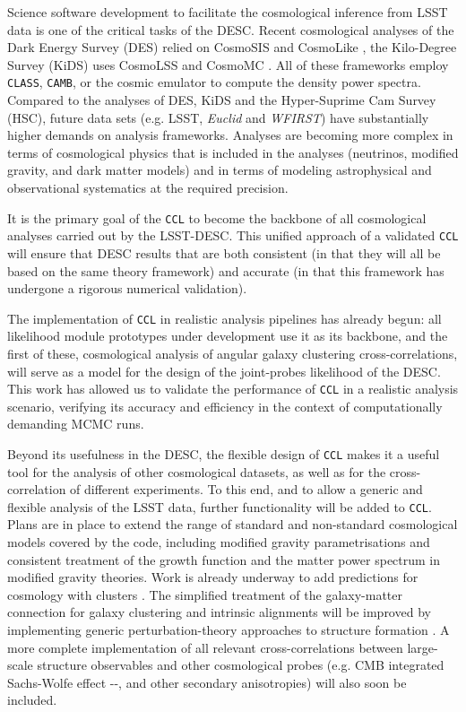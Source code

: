 \documentclass[\docopts]{\docclass}
\newcommand{\damonge}[1]{\textcolor{green!55!blue}{DA: #1}}
\newcommand{\ccl}{{\tt CCL}\xspace}
\newcommand{\class}{{\tt CLASS}\xspace}
\newcommand{\camb}{{\tt CAMB}\xspace}
\begin{document}
Science software development to facilitate the cosmological inference from LSST data is one of the critical tasks of the DESC. Recent cosmological analyses of the Dark Energy Survey (DES) relied on CosmoSIS \citep{Zuntz14} and CosmoLike \citep{krause17}, the Kilo-Degree Survey (KiDS) uses CosmoLSS \citep{Joudaki18} and CosmoMC \citep{Lewis02}. All of these frameworks employ \class, \camb \citep{Challinor2005}, or the cosmic emulator to compute the density power spectra. Compared to the analyses of DES, KiDS and the Hyper-Suprime Cam Survey (HSC), future data sets (e.g. LSST, {\it Euclid} and {\it WFIRST}) have substantially higher demands on analysis frameworks. Analyses are becoming more complex in terms of cosmological physics that is included in the analyses (neutrinos, modified gravity, and dark matter models) and in terms of modeling astrophysical and observational systematics at the required precision. 

It is the primary goal of the \ccl to become the backbone of all cosmological analyses carried out by the LSST-DESC. This unified approach of a validated \ccl will ensure that DESC results that are both consistent (in that they will all be based on the same theory framework) and accurate (in that this framework has undergone a rigorous numerical validation).

The implementation of \ccl in realistic analysis pipelines has already begun: all likelihood module prototypes under development use it as its backbone, and the first of these, cosmological analysis of angular galaxy clustering cross-correlations, will serve as a model for the design of the joint-probes likelihood of the DESC. This work has allowed us to validate the performance of \ccl in a realistic analysis scenario, verifying its accuracy and efficiency in the context of computationally demanding MCMC runs. %

Beyond its usefulness in the DESC, the flexible design of \ccl makes it a useful tool for the analysis of other cosmological datasets, as well as for the cross-correlation of different experiments. To this end, and to allow a generic and flexible analysis of the LSST data, further functionality will be added to \ccl. Plans are in place to extend the range of standard and non-standard cosmological models covered by the code, including modified gravity parametrisations \citep{Baker11} and consistent treatment of the growth function and the matter power spectrum in modified gravity theories. Work is already underway to add predictions for cosmology with clusters \citep{McClintock18}. The simplified treatment of the galaxy-matter connection for galaxy clustering and intrinsic alignments will be improved by implementing generic perturbation-theory approaches to structure formation \citep{2009JCAP...08..020M,FASTPT}. A more complete implementation of all relevant cross-correlations between large-scale structure observables and other cosmological probes (e.g. CMB integrated Sachs-Wolfe effect -\citealt{1967ApJ...147...73S}-, and other secondary anisotropies) will also soon be included. 
\end{document}
